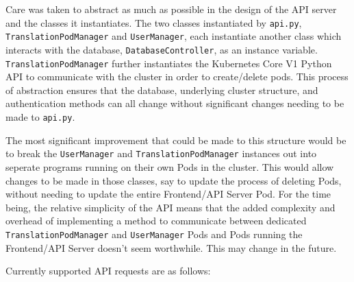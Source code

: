 \documentclass[12pt]{article}
\begin{document}
Care was taken to abstract as much as possible in the design of the
API server and the classes it instantiates.  The two classes
instantiated by \lstinline{api.py}, \lstinline{TranslationPodManager}
and \lstinline{UserManager}, each instantiate another class which
interacts with the database, \lstinline{DatabaseController}, as an
instance variable.  \lstinline{TranslationPodManager} further
instantiates the Kubernetes Core V1 Python API to communicate with the
cluster in order to create/delete pods.  This process of abstraction
ensures that the database, underlying cluster structure, and
authentication methods can all change without significant changes
needing to be made to \lstinline{api.py}.
\par

The most significant improvement that could be made to this structure
would be to break the \lstinline{UserManager} and
\lstinline{TranslationPodManager} instances out into seperate programs
running on their own Pods in the cluster.  This would allow changes to
be made in those classes, say to update the process of deleting Pods,
without needing to update the entire Frontend/API Server Pod.  For the
time being, the relative simplicity of the API means that the added
complexity and overhead of implementing a method to communicate
between dedicated \lstinline{TranslationPodManager} and
\lstinline{UserManager} Pods and Pods running the Frontend/API Server
doesn't seem worthwhile.  This may change in the future.
\par

Currently supported API requests are as follows:
\end{document}
